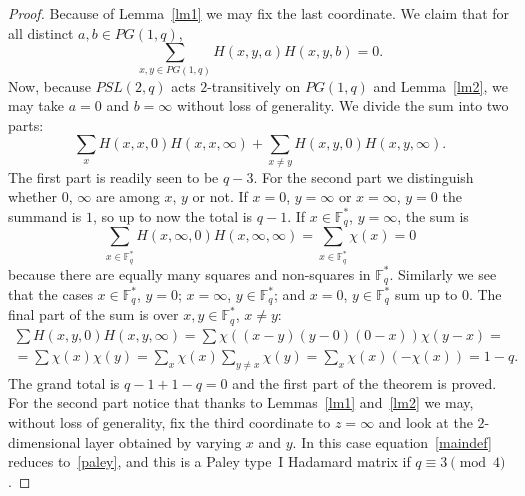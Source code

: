 \documentclass[10pt,a4paper]{amsart}
\def\F{\mathbb{F}}
\begin{document}
\begin{proof}
Because of Lemma~\ref{lm1} we may fix the last coordinate. We claim that
for all distinct $a,b\in PG(1,q)$,
$$\sum_{x,y\in PG(1,q)} H(x,y,a) H(x,y,b)=0.$$
Now, because $PSL(2,q)$ acts $2$-transitively on $PG(1,q)$ and Lemma~\ref{lm2},
we may take $a=0$ and $b=\infty$ without loss of generality. We divide the sum
into two parts:
$$\sum_{x} H(x,x,0)H(x,x,\infty) + \sum_{x\neq y} H(x,y,0)H(x,y,\infty).$$
The first part is readily seen to be $q-3$. For the second part we distinguish whether
$0$, $\infty$ are among $x$, $y$ or not. If $x=0$, $y=\infty$ or $x=\infty$, $y=0$
the summand is $1$, so up to now the total is $q-1$. If $x\in \F_q^*$, $y=\infty$, the
sum is $$\sum_{x\in \F_q^*} H(x,\infty,0)H(x,\infty,\infty)=\sum_{x\in \F_q^*} \chi(x)=0$$
because there are equally many squares and non-squares in $\F_q^*$. Similarly we see that
the cases $x\in \F_q^*$, $y=0$; $x=\infty$, $y \in \F_q^*$; and $x=0$, $y \in \F_q^*$ sum
up to $0$. The final part of the sum is over $x,y\in \F_q^*$, $x\neq y$:
\begin{multline*}
\sum H(x,y,0)H(x,y,\infty)=\sum \chi((x-y)(y-0)(0-x))\chi(y-x)= \\[2mm]
= \sum \chi(x)\chi(y) =\sum_x \chi(x)\sum_{y\neq x}\chi(y) = \sum_x \chi(x)(-\chi(x))=1-q.
\end{multline*}
The grand total is $q-1+1-q=0$ and the first part of the theorem is proved. For the second
part notice that thanks to Lemmas~\ref{lm1} and~\ref{lm2} we may, without loss of generality,
fix the third coordinate to $z=\infty$ and look at the $2$-dimensional layer obtained by
varying $x$ and $y$. In this case equation~\eqref{maindef} reduces to~\eqref{paley}, and
this is a Paley type~I Hadamard matrix if $q\equiv 3 \pmod{4}$.
\end{proof}
\end{document}
